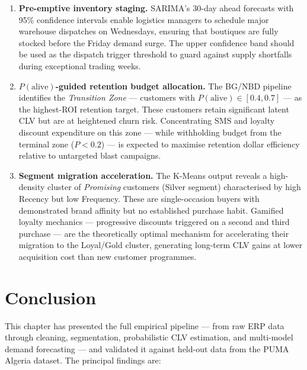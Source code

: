 \begin{enumerate}

    \item \textbf{Pre-emptive inventory staging.} SARIMA's 30-day ahead forecasts with 95\% confidence intervals enable logistics managers to schedule major warehouse dispatches on Wednesdays, ensuring that boutiques are fully stocked before the Friday demand surge. The upper confidence band should be used as the dispatch trigger threshold to guard against supply shortfalls during exceptional trading weeks.

    \item \textbf{$P(\text{alive})$-guided retention budget allocation.} The BG/NBD pipeline identifies the \textit{Transition Zone} — customers with $P(\text{alive}) \in [0.4, 0.7]$ — as the highest-ROI retention target. These customers retain significant latent CLV but are at heightened churn risk. Concentrating SMS and loyalty discount expenditure on this zone — while withholding budget from the terminal zone ($P < 0.2$) — is expected to maximise retention dollar efficiency relative to untargeted blast campaigns.

    \item \textbf{Segment migration acceleration.} The K-Means output reveals a high-density cluster of \textit{Promising} customers (Silver segment) characterised by high Recency but low Frequency. These are single-occasion buyers with demonstrated brand affinity but no established purchase habit. Gamified loyalty mechanics — progressive discounts triggered on a second and third purchase — are the theoretically optimal mechanism for accelerating their migration to the Loyal/Gold cluster, generating long-term CLV gains at lower acquisition cost than new customer programmes.

\end{enumerate}

\section*{Conclusion}

This chapter has presented the full empirical pipeline — from raw ERP data through cleaning, segmentation, probabilistic CLV estimation, and multi-model demand forecasting — and validated it against held-out data from the PUMA Algeria dataset. The principal findings are:

